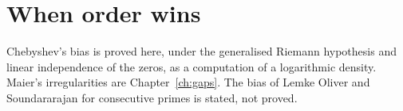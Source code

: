\chapter{When order wins}\label{ch:oc-bias}\label{ch:bias}

Chebyshev's bias is proved here, under the generalised Riemann hypothesis and linear independence of the zeros, as a computation of a logarithmic density. Maier's irregularities are Chapter~\ref{ch:gaps}. The bias of Lemke Oliver and Soundararajan for consecutive primes is stated, not proved.


